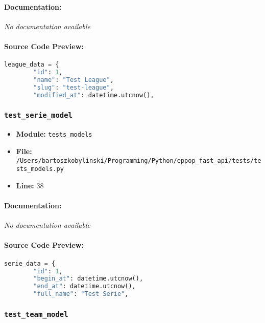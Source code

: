 \documentclass[11pt,a4paper]{article}
\begin{document}
\paragraph{Documentation:} \textit{No documentation available}

\paragraph{Source Code Preview:}
\begin{lstlisting}[language=Python]
    league_data = {
        "id": 1,
        "name": "Test League",
        "slug": "test-league",
        "modified_at": datetime.utcnow(),
\end{lstlisting}

\vspace{1em}
\subsubsection{\texttt{test\_serie\_model}}

\begin{itemize}
    \item \textbf{Module:} \texttt{tests\_models}
    \item \textbf{File:} \texttt{/Users/bartoszkobylinski/Programming/Python/eppop\_fast\_api/tests/tests\_models.py}
    \item \textbf{Line:} 38
\end{itemize}

\paragraph{Documentation:} \textit{No documentation available}

\paragraph{Source Code Preview:}
\begin{lstlisting}[language=Python]
    serie_data = {
        "id": 1,
        "begin_at": datetime.utcnow(),
        "end_at": datetime.utcnow(),
        "full_name": "Test Serie",
\end{lstlisting}

\vspace{1em}
\subsubsection{\texttt{test\_team\_model}}
\end{document}
